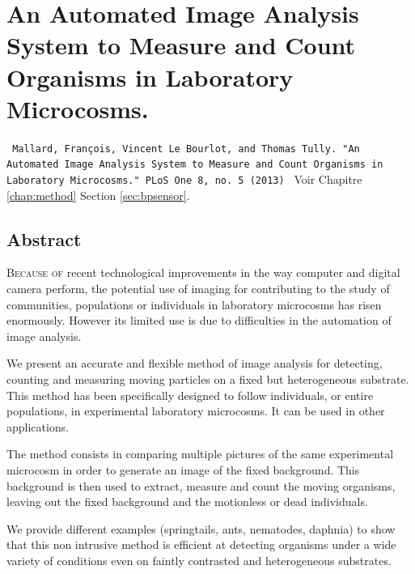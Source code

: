 \chapter{An Automated Image
Analysis System to Measure and Count Organisms in Laboratory Microcosms.}
\label{Ann:bpsensor}

\begin{Spacing}{1}
\texttt{
Mallard, François, Vincent Le Bourlot, and Thomas Tully. "An Automated Image
Analysis System to Measure and Count Organisms in Laboratory Microcosms." PLoS
One 8, no. 5 (2013)
}
Voir Chapitre \ref{chap:method} Section \ref{sec:bpsensor}.
\end{Spacing}

\section*{Abstract}

\lettrine[lines=3]{B}{ecause of} recent technological improvements in the way
computer and digital camera perform, the potential use of imaging for contributing to the study of
communities, populations or individuals in laboratory microcosms has risen
enormously. However its limited use is due to difficulties in the automation of
image analysis.

We present an accurate and flexible method of image analysis for detecting,
counting and measuring moving particles on a fixed but heterogeneous substrate.
This method has been specifically designed to follow individuals, or entire
populations, in experimental laboratory microcosms. It can be used in other
applications.

The method consists in comparing multiple pictures of the same experimental
microcosm in order to generate an image of the fixed background. This background
is then used to extract, measure and count the moving organisms, leaving out the
fixed background and the motionless or dead individuals.

We provide different examples (springtails, ants, nematodes, daphnia) to show
that this non intrusive method is efficient at detecting organisms under a wide
variety of conditions even on faintly contrasted and heterogeneous substrates.

